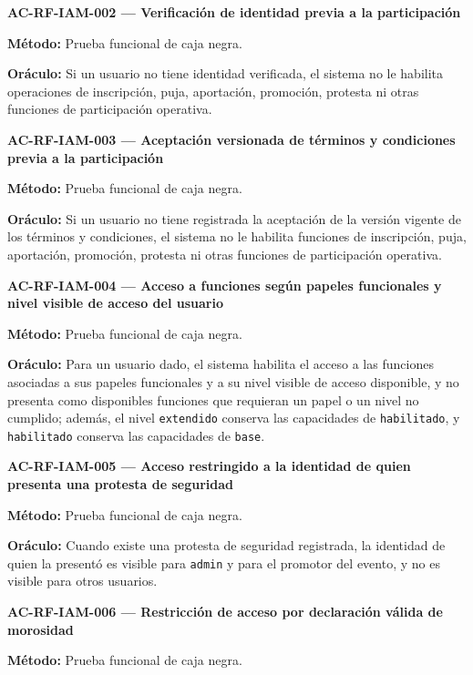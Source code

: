\documentclass[10pt,letterpaper]{article}
\begin{document}
\noindent\textbf{AC-RF-IAM-002 --- Verificación de identidad previa a la participación}\par
\textbf{Método:} Prueba funcional de caja negra.\par
\textbf{Oráculo:} Si un usuario no tiene identidad verificada, el sistema no le habilita operaciones de inscripción, puja, aportación, promoción, protesta ni otras funciones de participación operativa.\par\vspace{0.45em}
\noindent\textbf{AC-RF-IAM-003 --- Aceptación versionada de términos y condiciones previa a la participación}\par
\textbf{Método:} Prueba funcional de caja negra.\par
\textbf{Oráculo:} Si un usuario no tiene registrada la aceptación de la versión vigente de los términos y condiciones, el sistema no le habilita funciones de inscripción, puja, aportación, promoción, protesta ni otras funciones de participación operativa.\par\vspace{0.45em}
\noindent\textbf{AC-RF-IAM-004 --- Acceso a funciones según papeles funcionales y nivel visible de acceso del usuario}\par
\textbf{Método:} Prueba funcional de caja negra.\par
\textbf{Oráculo:} Para un usuario dado, el sistema habilita el acceso a las funciones asociadas a sus papeles funcionales y a su nivel visible de acceso disponible, y no presenta como disponibles funciones que requieran un papel o un nivel no cumplido; además, el nivel \texttt{extendido} conserva las capacidades de \texttt{habilitado}, y \texttt{habilitado} conserva las capacidades de \texttt{base}.\par\vspace{0.45em}
\noindent\textbf{AC-RF-IAM-005 --- Acceso restringido a la identidad de quien presenta una protesta de seguridad}\par
\textbf{Método:} Prueba funcional de caja negra.\par
\textbf{Oráculo:} Cuando existe una protesta de seguridad registrada, la identidad de quien la presentó es visible para \texttt{admin} y para el promotor del evento, y no es visible para otros usuarios.\par\vspace{0.45em}
\noindent\textbf{AC-RF-IAM-006 --- Restricción de acceso por declaración válida de morosidad}\par
\textbf{Método:} Prueba funcional de caja negra.\par
\end{document}
